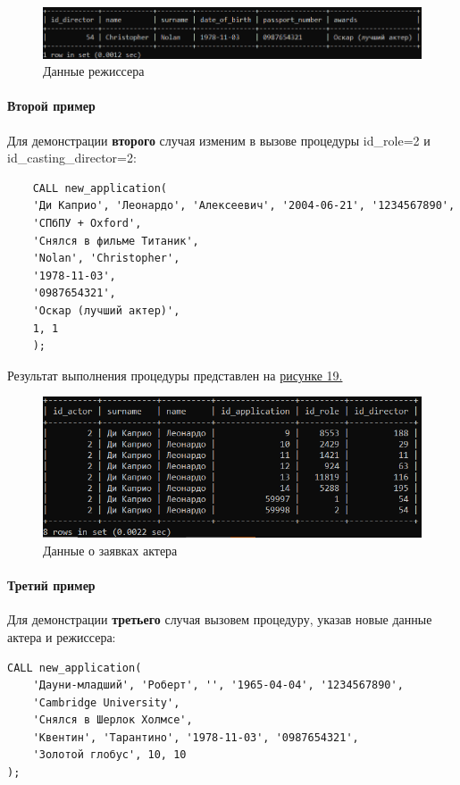 \documentclass[11pt,a4paper,final]{article} %
\begin{document}
\begin{figure}[H]
	\centering
	\includegraphics[width=1.0\linewidth]{pic18.png}
	\caption{Данные режиссера}
	\label{fig:pic18}
\end{figure}

\paragraph{Второй пример}

Для демонстрации \textbf{второго} случая изменим в вызове процедуры id\_role=2 и id\_casting\_director=2: 

\begin{lstlisting}
	CALL new_application(
	'Ди Каприо', 'Леонардо', 'Алексеевич', '2004-06-21', '1234567890',        
	'СПбПУ + Oxford',
	'Снялся в фильме Титаник',       
	'Nolan', 'Christopher',       
	'1978-11-03',  
	'0987654321',        
	'Оскар (лучший актер)',
	1, 1                   
	);
\end{lstlisting}

Результат выполнения процедуры представлен на \hyperref[fig:pic19]{рисунке 19.}

\begin{figure}[H]
	\centering
	\includegraphics[width=1.0\linewidth]{pic19.png}
	\caption{Данные о заявках актера}
	\label{fig:pic19}
\end{figure}

\paragraph{Третий пример}

Для демонстрации \textbf{третьего} случая вызовем процедуру, указав новые данные актера и режиссера:

\begin{lstlisting}
CALL new_application(
	'Дауни-младший', 'Роберт', '', '1965-04-04', '1234567890',        
	'Cambridge University',
	'Снялся в Шерлок Холмсе',       
	'Квентин', 'Тарантино', '1978-11-03', '0987654321',        
    'Золотой глобус', 10, 10                   
);
\end{lstlisting}
\end{document}
